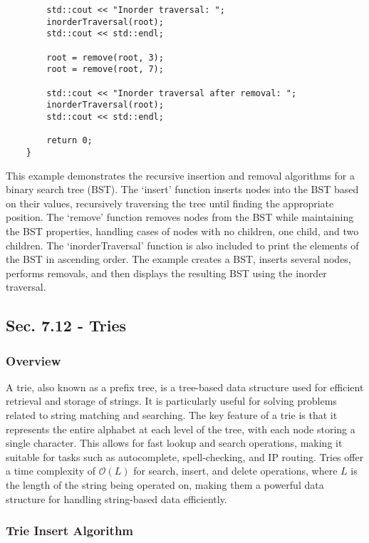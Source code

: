 \begin{solution}
\begin{verbatim}
        std::cout << "Inorder traversal: ";
        inorderTraversal(root);
        std::cout << std::endl;
    
        root = remove(root, 3);
        root = remove(root, 7);
    
        std::cout << "Inorder traversal after removal: ";
        inorderTraversal(root);
        std::cout << std::endl;
    
        return 0;
    }
    \end{verbatim}

    \horizontalline

    This example demonstrates the recursive insertion and removal algorithms for a binary search tree (BST). The `insert' function inserts nodes into the BST based on their values, recursively traversing the tree until finding the appropriate position. The `remove' function removes nodes from the BST while maintaining the BST 
    properties, handling cases of nodes with no children, one child, and two children. The `inorderTraversal' function is also included to print the elements of the BST in ascending order. The example creates a BST, inserts several nodes, performs removals, and then displays the resulting BST using the inorder traversal.
\end{solution}

\subsection*{Sec. 7.12 - Tries}

\subsubsection{Overview}

A trie, also known as a prefix tree, is a tree-based data structure used for efficient retrieval and storage of strings. It is particularly useful for solving problems related to string matching and searching. The key feature of a trie is that it represents the entire alphabet at each level of the tree, with each node storing a single character. 
This allows for fast lookup and search operations, making it suitable for tasks such as autocomplete, spell-checking, and IP routing. Tries offer a time complexity of $\mathcal{O}(L)$ for search, insert, and delete operations, where $L$ is the length of the string being operated on, making them a powerful data structure for handling string-based data efficiently.

\subsubsection{Trie Insert Algorithm}

